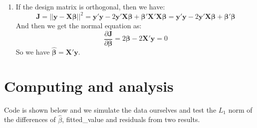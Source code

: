 \documentclass[12pt]{article}
\newcommand{\ttt}[1]{\textbf{#1}}
\begin{document}
\begin{enumerate}
\begin{proof}
        Therefore we can see that the three matrices above all have and only have $r$ nonzero singular values, which means they are all of rank $r$.
        Then we get $rank(\ttt{X}) = rank(\ttt{X}') = rank(\ttt{X}'\ttt{X}) = rank(\ttt{X}\ttt{X}')$.
    \end{proof}
    \item
    If the design matrix is orthogonal, then we have:
    $$\ttt{J} = ||\ttt{y} - \ttt{X}\bm{\beta}||^2 = \ttt{y}'\ttt{y} - 2 \ttt{y}'\ttt{X}\bm{\beta} + \bm{\beta}' \ttt{X}'\ttt{X} \bm{\beta} = \ttt{y}'\ttt{y} - 2 \ttt{y}'\ttt{X}\bm{\beta} + \bm{\beta}'\bm{\beta}$$
    And then we get the normal equation as:
    $$\frac{\partial \ttt{J}}{\partial \bm{\beta}} = 2 \bm{\beta} - 2 \ttt{X}'\ttt{y} = 0$$
    So we have $\hat{\bm{\beta}} = \ttt{X}'\ttt{y}$. 
\end{enumerate}

\section{Computing and analysis}
Code is shown below and we simulate the data ourselves and test the $L_1$ norm of the differences of $\hat{\beta}$, fitted\_value and residuals from two results. 


\end{document}
